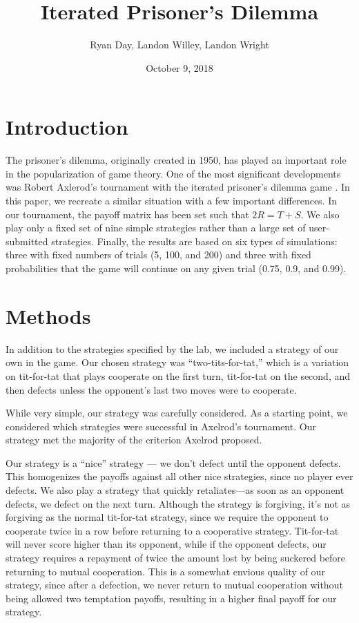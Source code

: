 \documentclass[a4paper]{article}
\title{Iterated Prisoner's Dilemma}
\author{Ryan Day, Landon Willey, Landon Wright}
\date{October 9, 2018}
\begin{document}
\maketitle

\section{Introduction}
The prisoner's dilemma, originally created in 1950, has played an important role in the popularization of game theory. One of the most significant developments was Robert Axlerod's tournament with the iterated prisoner's dilemma game \cite{axelrod1981evolution}. In this paper, we recreate a similar situation with a few important differences. In our tournament, the payoff matrix has been set such that $2R=T+S$. We also play only a fixed set of nine simple strategies rather than a large set of user-submitted strategies. Finally, the results are based on six types of simulations: three with fixed numbers of trials (5, 100, and 200) and three with fixed probabilities that the game will continue on any given trial (0.75, 0.9, and 0.99).

\section{Methods}
In addition to the strategies specified by the lab, we included a strategy of our own in the game. Our chosen strategy was ``two-tits-for-tat,'' which is a variation on tit-for-tat that plays cooperate on the first turn, tit-for-tat on the second, and then defects unless the opponent's last two moves were to cooperate.

While very simple, our strategy was carefully considered. As a starting point, we considered which strategies were successful in Axelrod's tournament. Our strategy met the majority of the criterion Axelrod proposed.

Our strategy is a ``nice'' strategy --- we don't defect until the opponent defects. This homogenizes the payoffs against all other nice strategies, since no player ever defects. We also play a strategy that quickly retaliates---as soon as an opponent defects, we defect on the next turn. Although the strategy is forgiving, it's not as forgiving as the normal tit-for-tat strategy, since we require the opponent to cooperate twice in a row before returning to a cooperative strategy. Tit-for-tat will never score higher than its opponent, while if the opponent defects, our strategy requires a repayment of twice the amount lost by being suckered before returning to mutual cooperation. This is a somewhat envious quality of our strategy, since after a defection, we never return to mutual cooperation without being allowed two temptation payoffs, resulting in a higher final payoff for our strategy.
\end{document}

